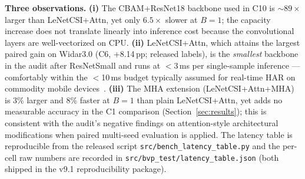 \documentclass[11pt]{article}
\theoremstyle{definition}
\begin{document}
\noindent\textbf{Three observations.} \textbf{(i)} The CBAM+ResNet18 backbone used in C10 is $\sim 89\times$ larger than LeNetCSI+Attn, yet only $6.5\times$ slower at $B{=}1$; the capacity increase does not translate linearly into inference cost because the convolutional layers are well-vectorized on CPU. \textbf{(ii)} LeNetCSI+Attn, which attains the largest paired gain on Widar3.0 (C6, +8.14\,pp; released labels), is the \emph{smallest} backbone in the audit after ResNetSmall and runs at $<$3\,ms per single-sample inference --- comfortably within the $<$10\,ms budget typically assumed for real-time HAR on commodity mobile devices~\cite{yang2022efficientfi}. \textbf{(iii)} The MHA extension (LeNetCSI+Attn+MHA) is $3\%$ larger and $8\%$ faster at $B{=}1$ than plain LeNetCSI+Attn, yet adds no measurable accuracy in the C1 comparison (Section~\ref{sec:results}); this is consistent with the audit's negative findings on attention-style architectural modifications when paired multi-seed evaluation is applied. The latency table is reproducible from the released script \texttt{src/bench\_latency\_table.py} and the per-cell raw numbers are recorded in \texttt{src/bvp\_test/latency\_table.json} (both shipped in the v9.1 reproducibility package).
\end{document}
